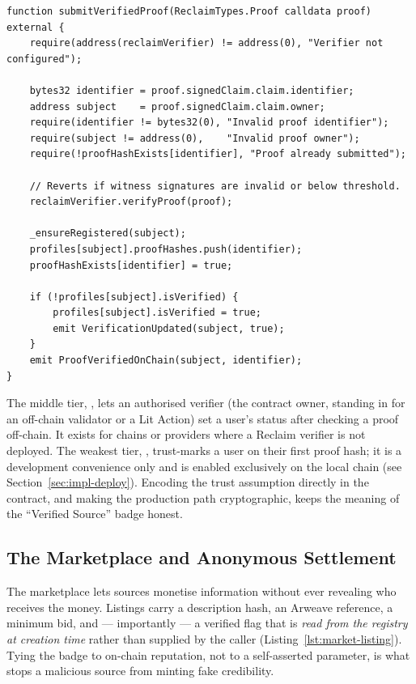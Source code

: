 \begin{lstlisting}[language=Solidity,caption={Trustless on-chain proof verification (\code{WhistleblowerRegistry.sol}).},label={lst:registry-verify}]
function submitVerifiedProof(ReclaimTypes.Proof calldata proof) external {
    require(address(reclaimVerifier) != address(0), "Verifier not configured");

    bytes32 identifier = proof.signedClaim.claim.identifier;
    address subject    = proof.signedClaim.claim.owner;
    require(identifier != bytes32(0), "Invalid proof identifier");
    require(subject != address(0),    "Invalid proof owner");
    require(!proofHashExists[identifier], "Proof already submitted");

    // Reverts if witness signatures are invalid or below threshold.
    reclaimVerifier.verifyProof(proof);

    _ensureRegistered(subject);
    profiles[subject].proofHashes.push(identifier);
    proofHashExists[identifier] = true;

    if (!profiles[subject].isVerified) {
        profiles[subject].isVerified = true;
        emit VerificationUpdated(subject, true);
    }
    emit ProofVerifiedOnChain(subject, identifier);
}
\end{lstlisting}

The middle tier, , lets an authorised verifier (the
contract owner, standing in for an off-chain validator or a Lit Action) set a
user's status after checking a proof off-chain. It exists for chains or providers
where a Reclaim verifier is not deployed. The weakest tier,
, trust-marks a user on their first proof hash; it is a
development convenience only and is enabled exclusively on the local chain (see
Section~\ref{sec:impl-deploy}). Encoding the trust assumption directly in the
contract, and making the production path cryptographic, keeps the meaning of the
``Verified Source'' badge honest.

\subsection{The Marketplace and Anonymous Settlement}
\label{sec:impl-marketplace}

The marketplace lets sources monetise information without ever revealing who
receives the money. Listings carry a description hash, an Arweave reference, a
minimum bid, and --- importantly --- a verified flag that is \emph{read from the
registry at creation time} rather than supplied by the caller
(Listing~\ref{lst:market-listing}). Tying the badge to on-chain reputation, not to
a self-asserted parameter, is what stops a malicious source from minting fake
credibility.

